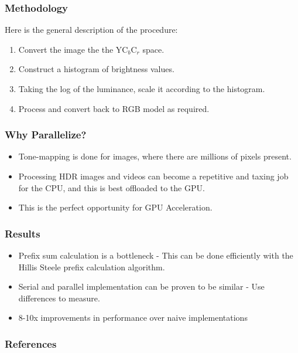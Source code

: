 \documentclass{beamer}
\begin{document}
\begin{frame}
    \frametitle{Methodology}
    Here is the general description of the procedure:
    \begin{enumerate}
        \item Convert the image the the YC$_b$C$_r$ space.
        \item Construct a histogram of brightness values.
        \item Taking the log of the luminance, scale it according to the histogram.
        \item Process and convert back to RGB model as required.
    \end{enumerate}
    

\end{frame}

\begin{frame}
    \frametitle{Why Parallelize?}
    \begin{itemize}
        \item Tone-mapping is done for images, where there are millions of pixels present.
        \item Processing HDR images and videos can become a repetitive and taxing job for the CPU, and this is best offloaded to the GPU.
        \item This is the perfect opportunity for GPU Acceleration.
    \end{itemize}
    
\end{frame}

\begin{frame}
    \frametitle{Results}
    \begin{itemize}
        \item Prefix sum calculation is a bottleneck - This can be done efficiently with the Hillis Steele prefix calculation algorithm.
        \item Serial and parallel implementation can be proven to be similar - Use differences to measure.
        \item 8-10x improvements in performance over naive implementations
    \end{itemize}
\end{frame}

\begin{frame}
    \frametitle{References}
    \begin{thebibliography}{00}
    \end{thebibliography}    

\end{frame}
\end{document}
